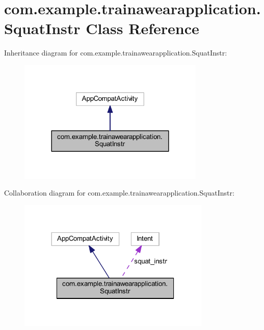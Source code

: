 \hypertarget{classcom_1_1example_1_1trainawearapplication_1_1_squat_instr}{}\section{com.\+example.\+trainawearapplication.\+Squat\+Instr Class Reference}
\label{classcom_1_1example_1_1trainawearapplication_1_1_squat_instr}


Inheritance diagram for com.\+example.\+trainawearapplication.\+Squat\+Instr\+:
\nopagebreak
\begin{figure}[H]
\begin{center}
\leavevmode
\includegraphics[width=252pt]{classcom_1_1example_1_1trainawearapplication_1_1_squat_instr__inherit__graph}
\end{center}
\end{figure}


Collaboration diagram for com.\+example.\+trainawearapplication.\+Squat\+Instr\+:
\nopagebreak
\begin{figure}[H]
\begin{center}
\leavevmode
\includegraphics[width=260pt]{classcom_1_1example_1_1trainawearapplication_1_1_squat_instr__coll__graph}
\end{center}
\end{figure}

